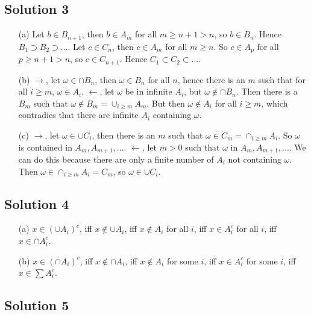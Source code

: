 \subsection*{Solution 3}

\begin{itemize}
    \item[(a)] Let $b \in B_{n+1}$, then $b \in A_m$ for all $m \geq n + 1 > n$, so $b \in B_n$.
        Hence $B_1 \supset B_2 \supset ...$.
        Let $c \in C_n$, then $c \in A_m$ for all $m \geq n$.
        So $c \in A_p$ for all $p \geq n + 1 > n$, so $c \in C_{n+1}$.
        Hence $C_1 \subset C_2 \subset ...$.
    \item[(b)] $\rightarrow$, let $\omega \in \cap B_n$, then $\omega \in B_n$ for all $n$, hence there is an $m$ such that for all $i \geq m$, $\omega \in A_i$.
        $\leftarrow$, let $\omega$ be in infinite $A_i$, but $\omega \notin \cap B_n$.
        Then there is a $B_m$ such that $\omega \notin B_m = \cup_{i \geq m} A_m$.
        But then $\omega \notin A_i$ for all $i \geq m$, which contradics that there are infinite $A_i$ containing $\omega$.
    \item[(c)] $\rightarrow$, let $\omega \in \cup C_i$, then there is an $m$ such that $\omega \in C_m = \cap_{i \geq m} A_i$.
        So $\omega$ is contained in $A_m, A_{m+1}, ...$.
        $\leftarrow$, let $m > 0$ such that $\omega$ in $A_m, A_{m+1}, ...$.
        We can do this because there are only a finite number of $A_i$ not containing $\omega$.
        Then $\omega \in \cap_{i \geq m} A_i = C_m$, so $\omega \in \cup C_i$.

\end{itemize}


\subsection*{Solution 4}

\begin{itemize}
    \item[(a)] $x \in (\cup A_i)^c$, iff $x \notin \cup A_i$, iff $x \notin A_i$ for all $i$, iff $x \in A_i^c$ for all $i$, iff $x \in \cap A_i^c$.
    \item[(b)] $x \in (\cap A_i)^c$, iff $x \notin \cap A_i$, iff $x \notin A_i$ for some $i$, iff $x \in A_i^c$ for some $i$, iff $x \in \sum A_i^c$.
\end{itemize}


\subsection*{Solution 5}

